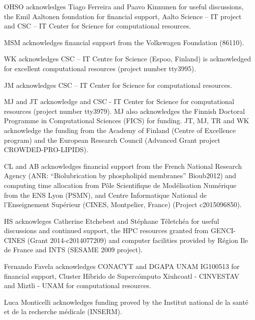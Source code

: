 \documentclass[journal=jacsat,manuscript=article]{achemso}
\begin{document}
\begin{acknowledgement}


OHSO acknowledges Tiago Ferreira and Paavo Kinnunen for useful discussions, 
the Emil Aaltonen foundation for financial support, 
Aalto Science -- IT project and CSC -- IT Center for Science for computational resources. 

MSM acknowledges financial support from the Volkswagen Foundation (86110).

WK acknowledges CSC -- IT Centre for Science (Espoo, Finland) is acknowledged for excellent computational resources (project number tty3995).

JM acknowledges CSC -- IT Center for Science for computational resources.


MJ and JT acknowledge and CSC - IT Center for Science for computational resources (project number tty3979).
MJ also acknowledges the Finnish Doctoral Programme in Computational Sciences (FICS) for funding.
JT, MJ, TR and WK acknowledge the funding from the Academy of Finland (Centre of Excellence program) 
and the European Research Council (Advanced Grant project CROWDED-PRO-LIPIDS).


CL and AB acknowledges financial support from the French National Research Agency
(ANR: “Biolubrication by phospholipid membranes” Bioub2012) and
computing time allocation from P{\^o}le Scientifique de Mod{\'e}lisation Num{\'e}rique from the ENS Lyon (PSMN),
and Centre Informatique National de l'Enseignement Sup{\'e}rieur (CINES, Montpelier, France)
(Project c2015096850).

HS acknowleges Catherine Etchebest and St\'ephane T\'eletch\'ea for useful discussions and continued support, the HPC resources granted from GENCI-CINES (Grant 2014-c2014077209) and computer facilities provided by R\'egion Ile de France and INTS (SESAME 2009 project).

Fernando Favela acknowledges CONACYT and DGAPA UNAM IG100513
for financial support, Cluster H\'ibrido de Superc\'omputo Xiuhcoatl - CINVESTAV and Miztli - UNAM for computational resources. 

Luca Monticelli acknowledges funding proved by the Institut national de la sant\'e et de la recherche m\'edicale (INSERM).



\end{acknowledgement}
\end{document}

